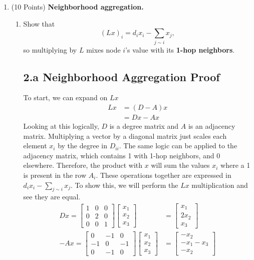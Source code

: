 \documentclass[twoside,10pt]{article}
\begin{document}
\begin{enumerate}[label=(\arabic*)]

    \item (10 Points) \textbf{Neighborhood aggregation.}
    \begin{enumerate}[label=(\alph*)]
        \item Show that 
        \[
        (Lx)_i = d_i x_i - \sum_{j\sim i} x_j,
        \]
        so multiplying by $L$ mixes node $i$’s value with its \textbf{1-hop neighbors}.
        \subsection*{2.a Neighborhood Aggregation Proof}
        To start, we can expand on $Lx$
        \begin{align*}
            Lx &= (D-A)x \\
            &= Dx - Ax
        \end{align*}
        Looking at this logically, $D$ is a degree matrix and $A$ is an adjacency matrix. Multiplying a vector by a diagonal matrix just scales each element $x_i$ by the degree in $D_{ii}$. The same logic can be applied to the adjacency matrix, which contains 1 with 1-hop neighbors, and 0 elsewhere. Therefore, the product with $x$ will sum the values $x_i$ where a 1 is present in the row $A_i$. These operations together are expressed in $d_i x_i - \sum_{j\sim i} x_j$. To show this, we will perform the $Lx$ multiplication and see they are equal.
        \begin{align*}
            Dx = \begin{bmatrix}1&0&0 \\0&2&0 \\0&0&1\end{bmatrix} \begin{bmatrix}x_1\\x_2\\x_3 \end{bmatrix} &= \begin{bmatrix} x_1 \\ 2x_2\\x_3 \end{bmatrix} \\
            -Ax = \begin{bmatrix}0&-1&0 \\-1&0&-1 \\0&-1&0 \end{bmatrix} \begin{bmatrix} x_1\\x_2\\x_3\end{bmatrix} &= \begin{bmatrix} -x_2\\-x_1-x_3\\-x_2 \end{bmatrix} \\

\end{align*}
\end{enumerate}
\end{enumerate}
\end{document}
